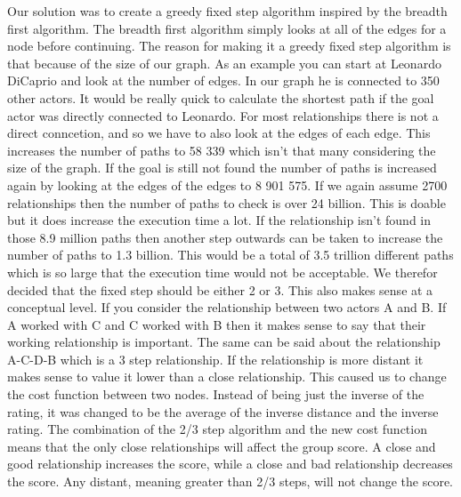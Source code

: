 Our solution was to create a greedy fixed step algorithm inspired by the breadth first algorithm. The breadth first algorithm simply looks at all of the edges for a node before continuing. The reason for making it a greedy fixed step algorithm is that because of the size of our graph. As an example you can start at Leonardo DiCaprio and look at the number of edges. In our graph he is connected to 350 other actors. It would be really quick to calculate the shortest path if the goal actor was directly connected to Leonardo. For most relationships there is not a direct conncetion, and so we have to also look at the edges of each edge. This increases the number of paths to 58 339 which isn't that many considering the size of the graph. If the goal is still not found the number of paths is increased again by looking at the edges of the edges to 8 901 575. If we again assume 2700 relationships then the number of paths to check is over 24 billion. This is doable but it does increase the execution time a lot. If the relationship isn't found in those 8.9 million paths then another step outwards can be taken to increase the number of paths to 1.3 billion. This would be a total of 3.5 trillion different paths which is so large that the execution time would not be acceptable. We therefor decided that the fixed step should be either 2 or 3. This also makes sense at a conceptual level. If you consider the relationship between two actors A and B. If A worked with C and C worked with B then it makes sense to say that their working relationship is important. The same can be said about the relationship A-C-D-B which is a 3 step relationship. If the relationship is more distant it makes sense to value it lower than a close relationship. This caused us to change the cost function between two nodes. Instead of being just the inverse of the rating, it was changed to be the average of the inverse distance and the inverse rating. The combination of the 2/3 step algorithm and the new cost function means that the only close relationships will affect the group score. A close and good relationship increases the score, while a close and bad relationship decreases the score. Any distant, meaning greater than 2/3 steps, will not change the score. 

